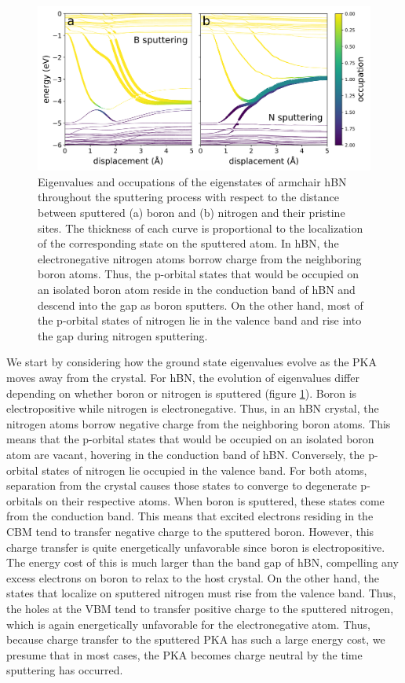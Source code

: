 \documentclass{article}
\begin{document}
\begin{figure}
  \centering
  \includegraphics[width=\textwidth]{fig4.pdf}
  \caption{
    Eigenvalues and occupations of the eigenstates of armchair hBN throughout
    the sputtering process with respect to the distance between sputtered (a)
    boron and (b) nitrogen and their pristine sites.
    The thickness of each curve is proportional to the localization of the
    corresponding state on the sputtered atom.
    In hBN, the electronegative nitrogen atoms borrow charge from the
    neighboring boron atoms.
    Thus, the p-orbital states that would be occupied on an isolated boron atom
    reside in the conduction band of hBN and descend into the gap as boron
    sputters.
    On the other hand, most of the p-orbital states of nitrogen lie in the
    valence band and rise into the gap during nitrogen sputtering.
  }
  \label{fig:eigenvals}
\end{figure}

We start by considering how the ground state eigenvalues evolve as the PKA
moves away from the crystal.  For hBN, the evolution of eigenvalues differ
depending on whether boron or nitrogen is sputtered (figure
\ref{fig:eigenvals}).  Boron is electropositive while nitrogen is
electronegative.  Thus, in an hBN crystal, the nitrogen atoms borrow negative
charge from the neighboring boron atoms.  This means that the p-orbital states
that would be occupied on an isolated boron atom are vacant, hovering in
the conduction band of hBN.  Conversely, the p-orbital states of nitrogen lie
occupied in the valence band.
For both atoms, separation from the crystal causes those states to converge to
degenerate p-orbitals on their respective atoms.
When boron is sputtered, these states come from the conduction band.
This means that excited electrons residing in the CBM tend to transfer
negative charge to the sputtered boron.  However, this charge transfer is quite
energetically unfavorable since boron is electropositive. The energy cost of
this is much larger than the band gap of hBN, compelling any excess electrons
on boron to relax to the host crystal. On the other hand, the states that
localize on sputtered nitrogen must rise from the valence band.
Thus, the holes at the VBM tend to transfer positive charge to the sputtered
nitrogen, which is again energetically unfavorable for the electronegative
atom.
Thus, because charge transfer to the sputtered PKA has such a large energy
cost, we presume that in most cases, the PKA becomes charge neutral by the time
sputtering has occurred.
\end{document}
